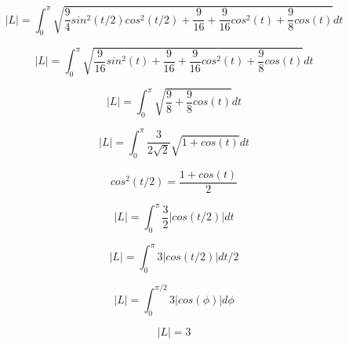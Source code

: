 \documentclass{article}
\begin{document}
\begin{equation*}
    |L| = \int_{0}^{\pi} \sqrt{\frac{9}{4} sin^2(t/2) cos^2(t/2)+\frac{9}{16}+\frac{9}{16}cos^2(t)+\frac{9}{8}cos(t)}dt
\end{equation*}

\begin{equation*}
    |L| = \int_{0}^{\pi} \sqrt{\frac{9}{16} sin^2(t)+\frac{9}{16}+\frac{9}{16}cos^2(t)+\frac{9}{8}cos(t)}dt
\end{equation*}

\begin{equation*}
    |L| = \int_{0}^{\pi} \sqrt{\frac{9}{8}+\frac{9}{8}cos(t)}dt
\end{equation*}

\begin{equation*}
    |L| = \int_{0}^{\pi} \frac{3}{2\sqrt{2}} \sqrt{1+cos(t)}dt
\end{equation*}

\begin{equation*}
    cos^2(t/2) = \frac{1+cos(t)}{2}
\end{equation*}

\begin{equation*}
    |L| = \int_{0}^{\pi} \frac{3}{2} | cos(t/2) | dt
\end{equation*}

\begin{equation*}
    |L| = \int_{0}^{\pi} 3 | cos(t/2) | dt/2
\end{equation*}

\begin{equation*}
    |L| = \int_{0}^{\pi/2} 3 | cos(\phi) | d\phi
\end{equation*}

\begin{equation}
    |L| = 3
\end{equation}
\end{document}
